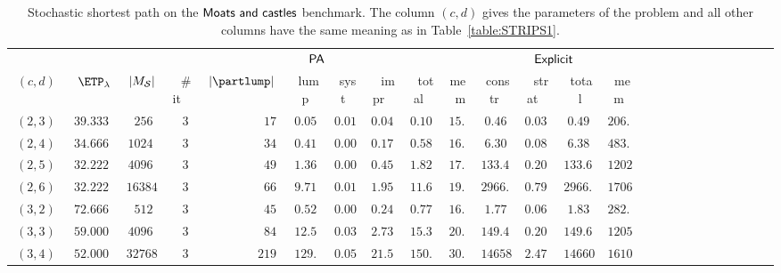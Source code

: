 \begin{table}[h!]
	\caption{Stochastic shortest path on the $\sf{Moats~and~castles}$ benchmark. The column $(c, d)$ gives the parameters of the problem and all other columns have the same meaning as in Table~\ref{table:STRIPS1}.}
	\label{table:STRIPS2}
	\centering
	\scriptsize
 		\begin{tabular}{|r|r|r||r|r|r|r|r|r|r||r|r|r|r|r|r|r|r|r|r|r|r|r|r|r|}
		\hline
	  	& & & \multicolumn{7}{|c||}{{\small $\sf{PA}$}} & \multicolumn{4}{|c|}{{\small $\sf{Explicit}$}}\rule[-2pt]{0pt}{10pt}\\
		$\ (c, d) \ $ & $\ETP_\lambda$  & $|M_{\cal S}|$  & \ $\#$it \  & $\ |\partlump|\ $ & \ lump  \ &  \ syst \  &  \ impr  \ & \  total \  & mem & \ constr \  & \ strat \ & \ total \ & \ mem\ \rule[-3pt]{0pt}{10pt}\\
\hline\hline
$\ (2,3)\ $ & $\ 39.3333\ $ & $\ 256\ $ & $\ 3\ $ & $\ 17\ $ & $\ 0.05\ $ & $\ 0.01\ $ & $\ 0.04\ $  & $\ 0.10\ $ & $\ 15.8\ $ & $\ 0.46\ $ & $\ 0.03\ $  & $\ 0.49\ $ & $\ 206.9\ $\rule[-3pt]{0pt}{10pt}\\
$\ (2,4)\ $ & $\ 34.6667\ $ & $\ 1024\ $ & $\ 3\ $ & $\ 34\ $ & $\ 0.41\ $ & $\ 0.00\ $ & $\ 0.17\ $  & $\ 0.58\ $ & $\ 16.5\ $ & $\ 6.30\ $ & $\ 0.08\ $  & $\ 6.38\ $ & $\ 483.8\ $\rule[-3pt]{0pt}{10pt}\\
$\ (2,5)\ $ & $\ 32.2222\ $ & $\ 4096\ $ & $\ 3\ $ & $\ 49\ $ & $\ 1.36\ $ & $\ 0.00\ $ & $\ 0.45\ $  & $\ 1.82\ $ & $\ 17.3\ $ & $\ 133.46\ $ & $\ 0.20\ $  & $\ 133.66\ $ & $\ 1202.5\ $\rule[-3pt]{0pt}{10pt}\\
$\ (2,6)\ $ & $\ 32.2222\ $ & $\ 16384\ $ & $\ 3\ $ & $\ 66\ $ & $\ 9.71\ $ & $\ 0.01\ $ & $\ 1.95\ $  & $\ 11.68\ $ & $\ 19.3\ $ & $\ 2966.01\ $ & $\ 0.79\ $  & $\ 2966.80\ $ & $\  1706.2\ $\rule[-3pt]{0pt}{10pt}\\
\hline $\ (3,2)\ $ & $\ 72.6667\ $ & $\ 512\ $ & $\ 3\ $ & $\ 45\ $ & $\ 0.52\ $ & $\ 0.00\ $ & $\ 0.24\ $  & $\ 0.77\ $ & $\ 16.6\ $ & $\ 1.77\ $ & $\ 0.06\ $  & $\ 1.83\ $ & $\ 282.9\ $\rule[-3pt]{0pt}{10pt}\\
$\ (3,3)\ $ & $\ 59.0000\ $ & $\ 4096\ $ & $\ 3\ $ & $\ 84\ $ & $\ 12.58\ $ & $\ 0.03\ $ & $\ 2.73\ $  & $\ 15.35\ $ & $\ 20.2\ $ & $\ 149.44\ $ & $\ 0.20\ $  & $\ 149.64\ $ & $\ 1205.5\ $\rule[-3pt]{0pt}{10pt}\\
$\ (3,4)\ $ & $\ 52.0000\ $ & $\ 32768\ $ & $\ 3\ $ & $\ 219\ $ & $\ 129.17\ $ & $\ 0.05\ $ & $\ 21.56\ $  & $\ 150.83\ $ & $\ 30.7\ $ & $\ 14658.22\ $ & $\ 2.47\ $  & $\ 14660.69\ $ & $\ 1610.9\ $\rule[-3pt]{0pt}{10pt}\\

\end{tabular}
\end{table}
